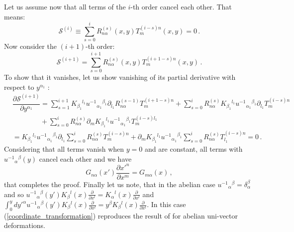\documentclass[12pt, utf8]{article}
\numberwithin{equation}{section}
\begin{document}
Let us assume now that all terms of the $i$-th order cancel each other. That means: 
\begin{equation}
   \mathcal{S}^{(i)} \equiv \sum_{s=0}^{i} R^{(s)}_{n \alpha}(x,y) T^{(i-s)n}_{m}(x,y) = 0 \, . 
\end{equation}
Now consider the $(i+1)$-th order:
\begin{equation}
    \mathcal{S}^{(i+1)} = \sum_{s=0}^{i+1} R^{(s)}_{n \alpha}(x,y) T^{(i+1-s)n}_{m}(x,y) \, .
\end{equation}
To show that it vanishes, let us show  vanishing of  its partial derivative with respect to $y^{\alpha_1}$ : 
\begin{equation}
    \begin{aligned}
        & \dfrac{\partial \mathcal{S}^{(i+1)}}{\partial y^{\alpha_1}} = \sum_{s=1}^{i+1} K_{\beta_1}{}^{l_1} u^{-1 }{}_{\alpha_1}{}^{\beta_1} \partial_{l_1} R^{(s-1)}_{n \alpha} T^{(i+1-s) n}_{m} + \sum_{s=0}^{i} R^{(s)}_{n \alpha} K_{\beta_1}{}^{l_1} u^{-1 }{}_{\alpha_1}{}^{\beta_1}  \partial_{l_1} T^{(i-s) n}_{m} \\
        & \qquad \qquad + \sum_{s=0}^{i} R^{(s)}_{n \alpha} \partial_{m} K_{\beta_1}{}^{l_1} u^{-1 }{}_{\alpha_1}{}^{\beta_1}   T^{(i-s) l_1}_{m} \\
        & = K_{\beta_1}{}^{l_1} u^{-1 }{}_{\alpha_1}{}^{\beta_1}  \partial_{l_1} \sum_{s=0}^{i} R^{(s)}_{n \alpha}  T^{(i-s) n}_{m} + \partial_{m} K_{\beta_1}{}^{l_1} u^{-1 }{}_{\alpha_1}{}^{\beta_1}  \sum_{s=0}^{i} R^{(s)}_{n \alpha}   T^{(i-s) n}_{l_1} = 0 \, . 
    \end{aligned}
\end{equation}
Considering that all terms vanish when $y=0$ and are constant, all terms with $u^{-1 }{}_{\alpha}{}^{\beta}(y)$ cancel each other  and we have 
\begin{equation}
    G_{n \alpha}(x') \dfrac{\partial{x'^{n}}}{\partial x^{m}} = G_{m\alpha}(x) \, ,
\end{equation}
that completes the proof. Finally let us note, that in the abelian case $u^{-1}{}_{\alpha}{}^{ \beta} = \delta^{\beta}_{\alpha}$ and so $u^{-1}{}_{\alpha}{}^{ \beta}(y') K_{\beta}{}^{l}(x) \frac{\partial}{\partial x^l} = K_{\alpha}{}^{l}(x) \frac{\partial}{\partial x^l}$ and $\int_{0}^{y} dy'^{\alpha} u^{-1}{}_{\alpha}{}^{ \beta}(y') K_{\beta}{}^{l}(x) \frac{\partial}{\partial x^l} = y^{\beta} K_{\beta}{}^{l}(x) \frac{\partial}{\partial x^l}$. In this case (\ref{coordinate_transformation}) reproduces the result of \cite{Gubarev:2025hvr} for abelian uni-vector deformations.
\end{document}
